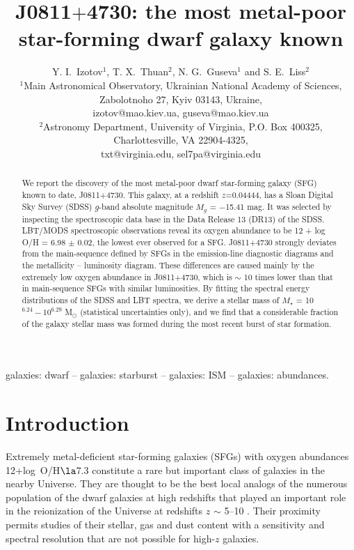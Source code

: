 \documentclass[useAMS,usenatbib]{mn2e}
\title[J0811$+$4730: the most-metal poor galaxy]
{J0811$+$4730: the most metal-poor star-forming dwarf galaxy known}
\author[Y. I. Izotov et al.]{Y. I.\ Izotov$^{1}$,
T. X.\ Thuan$^{2}$, N. G.\ Guseva$^{1}$ and S. E.\ Liss$^{2}$\\
                $^{1}$Main Astronomical Observatory,
                     Ukrainian National Academy of Sciences,
                     Zabolotnoho 27, Kyiv 03143,  Ukraine,\\
                     izotov@mao.kiev.ua, guseva@mao.kiev.ua\\
                $^{2}$Astronomy Department, University of Virginia, 
                     P.O. Box 400325, Charlottesville, VA 22904-4325,\\
                     txt@virginia.edu, sel7pa@virginia.edu\\
}
\begin{document}

\pagerange{\pageref{firstpage}--\pageref{lastpage}} 

\maketitle

\label{firstpage}

\begin{abstract}
We report the discovery of the most metal-poor dwarf star-forming galaxy (SFG)
known to date, J0811$+$4730. 
This galaxy, at a redshift $z$=0.04444, has a Sloan Digital Sky
Survey (SDSS) $g$-band absolute magnitude $M_g$ = $-$15.41 mag. It
was selected by inspecting the spectroscopic data base in the Data 
Release 13 (DR13) of the SDSS. 
LBT/MODS spectroscopic observations reveal its oxygen abundance to be 
12 + log O/H = 6.98 $\pm$ 0.02, the lowest ever observed for a SFG. 
J0811$+$4730 strongly deviates from the main-sequence defined by 
SFGs in the emission-line diagnostic diagrams and the 
metallicity -- luminosity diagram. These differences are caused mainly
by the extremely low oxygen abundance in J0811$+$4730, which is $\sim$ 10 times
lower than that in main-sequence SFGs with similar luminosities. 
By fitting the spectral energy distributions of the 
SDSS and LBT spectra, we derive a stellar mass of $M_\star$ = 
10$^{6.24} - 10^{6.29}$ M$_\odot$
(statistical uncertainties only), and we find that a considerable fraction of
the galaxy stellar mass was formed during the most recent burst of star 
formation.
\end{abstract}

\begin{keywords}
galaxies: dwarf -- galaxies: starburst -- galaxies: ISM -- galaxies: abundances.
\end{keywords}



\section{Introduction}\label{sec:INT}

Extremely metal-deficient 
star-forming galaxies (SFGs) with oxygen abundances
12+log~O/H$\la$7.3 constitute a rare but important class of galaxies
in the nearby Universe. They are thought to be the best local analogs of the
numerous population of the dwarf galaxies at high 
redshifts that played an important role in the reionization of the Universe 
at redshifts $z$ $\sim$ 5--10 \citep[e.g. ][]{O09,K17}. 
Their proximity permits studies of their stellar,
gas and dust content with a sensitivity and spectral resolution that are not 
possible for high-$z$ galaxies. 
\end{document}
